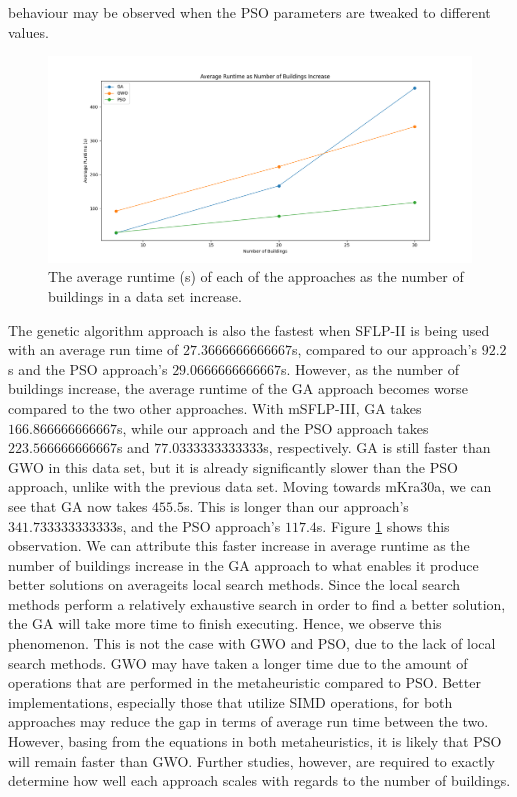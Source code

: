 behaviour may be observed when the PSO parameters are tweaked to different values.

\begin{figure}[h!]
\centering
\begin{adjustwidth}{-0.45in}{}
\includegraphics[scale=0.5]{./images/chap07-rd/approaches-average-runtime-over-no-of-buildings.png}
\end{adjustwidth}
\caption{The average runtime (s) of each of the approaches as the number of buildings in a data set increase.}
\label{graph-approaches-runtime-no-buildings}
\end{figure}

The genetic algorithm approach is also the fastest when SFLP-II is being used with an average run time of $27.3666666666667$s, compared to our approach's $92.2$s and the PSO approach's $29.0666666666667$s. However, as the number of buildings increase, the average runtime of the GA approach becomes worse compared to the two other approaches. With mSFLP-III, GA takes $166.866666666667$s, while our approach and the PSO approach takes $223.566666666667$s and $77.0333333333333$s, respectively. GA is still faster than GWO in this data set, but it is already significantly slower than the PSO approach, unlike with the previous data set. Moving towards mKra30a, we can see that GA now takes $455.5$s. This is longer than our approach's $341.733333333333$s, and the PSO approach's $117.4$s. Figure \ref{graph-approaches-runtime-no-buildings} shows this observation. We can attribute this faster increase in average runtime as the number of buildings increase in the GA approach to what enables it produce better solutions on average\textemdash its local search methods. Since the local search methods perform a relatively exhaustive search in order to find a better solution, the GA will take more time to finish executing. Hence, we observe this phenomenon. This is not the case with GWO and PSO, due to the lack of local search methods. GWO may have taken a longer time due to the amount of operations that are performed in the metaheuristic compared to PSO. Better implementations, especially those that utilize SIMD operations, for both approaches may reduce the gap in terms of average run time between the two. However, basing from the equations in both metaheuristics, it is likely that PSO will remain faster than GWO. Further studies, however, are required to exactly determine how well each approach scales with regards to the number of buildings.


